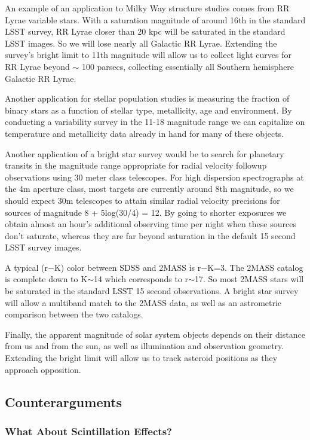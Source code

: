 An example of an application to Milky Way structure studies comes from RR Lyrae variable stars. With a saturation magnitude of around 16th in the standard LSST survey, RR Lyrae closer than 20 kpc will be saturated in the standard LSST images. So we will lose nearly all Galactic RR Lyrae. Extending the survey's bright limit to 11th magnitude will allow us to collect light curves for RR Lyrae beyond $\sim$ 100 parsecs, collecting essentially all Southern hemisphere Galactic RR Lyrae.

Another application for stellar population studies is measuring the fraction of binary stars as a function of stellar type, metallicity, age and environment. By conducting a variability survey in the 11-18 magnitude range we can capitalize on temperature and metallicity data already in hand for many of these objects. 

Another application of a bright star survey would be to search for planetary transits in the magnitude range appropriate for radial velocity followup observations using 30 meter class telescopes. For high dispersion spectrographs at the 4m aperture class, most targets are currently around 8th magnitude, so we should expect 30m telescopes to attain similar radial velocity precisions for sources of magnitude  8 + 5log(30/4) = 12. By going to shorter exposures we obtain almost an hour's additional observing time per night when these sources don't saturate, whereas they are far beyond saturation in the default 15 second LSST survey images. 

A typical (r$-$K) color between SDSS and 2MASS is r$-$K=3. The 2MASS catalog is complete down to K$\sim$14 which corresponds to r$\sim$17. So most 2MASS stars will be saturated in the standard LSST 15 second observations. A bright star survey will allow a multiband match to the 2MASS data, as well as an astrometric comparison between the two catalogs. 

Finally, the apparent magnitude of solar system objects depends on their distance from us and from the sun, as well as illumination and observation geometry. Extending the bright limit will allow us to track asteroid positions as they approach opposition.  

\subsection{Counterarguments}

\subsubsection{What About Scintillation Effects?}

